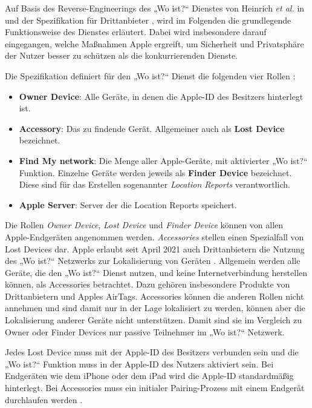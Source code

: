 Auf Basis des Reverse-Engineerings des „Wo ist?“ Dienstes von Heinrich \textit{et al.} in \cite{Heinrich_FindMy} und der Spezifikation für Drittanbieter \cite{Apple_FindMySpec}, wird im Folgenden die grundlegende Funktionsweise des Dienstes erläutert.
Dabei wird insbesondere darauf eingegangen, welche Maßnahmen Apple ergreift, um Sicherheit und Privatsphäre der Nutzer besser zu schützen als die konkurrierenden Dienste. 

Die Spezifikation definiert für den „Wo ist?“ Dienst die folgenden vier Rollen \cite{Apple_FindMySpec}:
\begin{itemize}
    \item \textbf{Owner Device}: Alle Geräte, in denen die Apple-ID des Besitzers hinterlegt ist.
    \item \textbf{Accessory}: Das zu findende Gerät. Allgemeiner auch als \textbf{Lost Device} bezeichnet.
    \item \textbf{Find My network}: Die Menge aller Apple-Geräte, mit aktivierter „Wo ist?“ Funktion. Einzelne Geräte werden jeweils als \textbf{Finder Device} bezeichnet. Diese sind für das Erstellen sogenannter \textit{Location Reports} verantwortlich.
    \item \textbf{Apple Server}: Server der die Location Reports speichert.
\end{itemize}
Die Rollen \textit{Owner Device}, \textit{Lost Device} und \textit{Finder Device} können von allen Apple-Endgeräten angenommen werden.
\textit{Accessories} stellen einen Spezialfall von Lost Devices dar.
Apple erlaubt seit April 2021 auch Drittanbietern die Nutzung des „Wo ist?“ Netzwerks zur Lokalisierung von Geräten \cite{Apple_FindMy3rdParty}.
Allgemein werden alle Geräte, die den „Wo ist?“ Dienst nutzen, und keine Internetverbindung herstellen können, als Accessories betrachtet.
Dazu gehören insbesondere Produkte von Drittanbietern und Apples AirTags.
Accessories können die anderen Rollen nicht annehmen und sind damit nur in der Lage lokalisiert zu werden, können aber die Lokalisierung anderer Geräte nicht unterstützen.
Damit sind sie im Vergleich zu Owner oder Finder Devices nur passive Teilnehmer im „Wo ist?“ Netzwerk.

Jedes Lost Device muss mit der Apple-ID des Besitzers verbunden sein und die „Wo ist?“ Funktion muss in der Apple-ID des Nutzers aktiviert sein.
Bei Endgeräten wie dem iPhone oder dem iPad wird die Apple-ID standardmäßig hinterlegt.
Bei Accessories muss ein initialer Pairing-Prozess mit einem Endgerät durchlaufen werden \cite{Apple_FindMySpec}.

